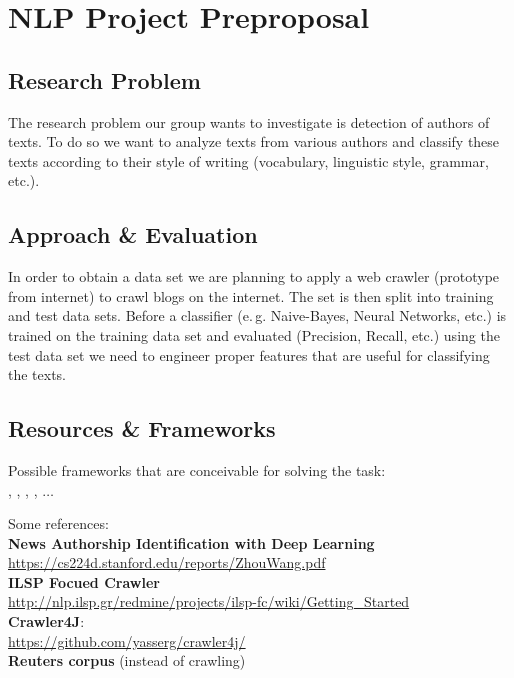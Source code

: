 \documentclass{scrartcl}
\begin{document}
\enlargethispage{4\baselineskip}
\section{NLP Project Preproposal}

\vspace*{-3mm}
\subsection{Research Problem}
\vspace*{-3mm}
The research problem our group wants to investigate is detection of authors of texts. To do so we want to analyze texts from various authors and classify these texts according to their style of writing (vocabulary, linguistic style, grammar, etc.).

\vspace*{-3mm}
\subsection{Approach \& Evaluation}
\vspace*{-3mm}
In order to obtain a data set we are planning to apply a web crawler (prototype from internet) to crawl blogs on the internet. The set is then split into training and test data sets. Before a classifier (e.\,g. Naive-Bayes, Neural Networks, etc.) is trained on the training data set and evaluated (Precision, Recall, etc.) using the test data set we need to engineer proper features that are useful for classifying the texts.

\vspace*{-3mm}
\subsection{Resources \& Frameworks}
\vspace*{-3mm}
Possible frameworks that are conceivable for solving the task: \\
, , , , $\dots$

Some references: \\
\textbf{News Authorship Identification with Deep Learning} \\
\url{https://cs224d.stanford.edu/reports/ZhouWang.pdf} \\
\textbf{ILSP Focued Crawler} \\
\url{http://nlp.ilsp.gr/redmine/projects/ilsp-fc/wiki/Getting_Started} \\
\textbf{Crawler4J}: \\
\url{https://github.com/yasserg/crawler4j/} \\
\textbf{Reuters corpus} (instead of crawling)
\end{document}

